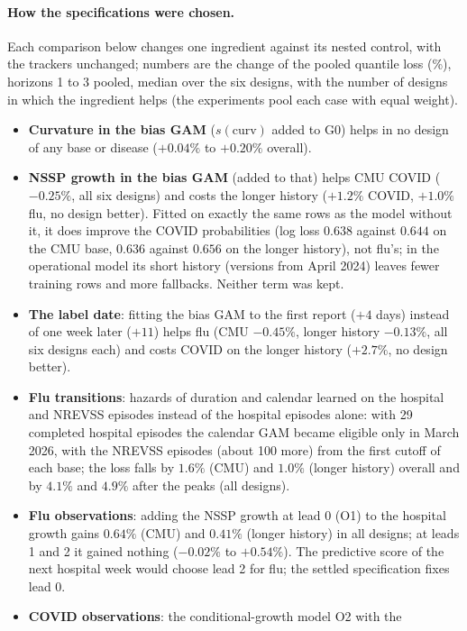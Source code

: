 \documentclass[11pt,a4paper]{article}
\theoremstyle{definition}
\theoremstyle{remark}
\begin{document}
\paragraph{How the specifications were chosen.}
Each comparison below changes one ingredient against its nested control,
with the trackers unchanged; numbers are the change of the pooled quantile
loss (\%), horizons 1 to 3 pooled, median over the six designs, with the
number of designs in which the ingredient helps (the experiments pool each
case with equal weight).
\begin{itemize}[leftmargin=*,itemsep=3pt]
\item \textbf{Curvature in the bias GAM} ($s(\mathrm{curv})$ added to G0) helps
in no design of any base or disease ($+0.04\%$ to $+0.20\%$ overall).
\item \textbf{NSSP growth in the bias GAM} (added to that) helps CMU COVID
($-0.25\%$, all six designs) and costs the longer history ($+1.2\%$ COVID,
$+1.0\%$ flu, no design better). Fitted on exactly the same rows as the model
without it, it does improve the COVID probabilities (log loss $0.638$ against
$0.644$ on the CMU base, $0.636$ against $0.656$ on the longer history), not
flu's; in the operational model its short history (versions from April 2024)
leaves fewer training rows and more fallbacks. Neither term was kept.
\item \textbf{The label date}: fitting the bias GAM to the first report ($+4$
days) instead of one week later ($+11$) helps flu (CMU $-0.45\%$, longer
history $-0.13\%$, all six designs each) and costs COVID on the longer
history ($+2.7\%$, no design better).
\item \textbf{Flu transitions}: hazards of duration and calendar learned on
the hospital and NREVSS episodes instead of the hospital episodes alone: with
29 completed hospital episodes the calendar GAM became eligible only in
March 2026, with the NREVSS episodes (about 100 more) from the first cutoff
of each base; the loss falls by $1.6\%$ (CMU) and $1.0\%$ (longer history)
overall and by $4.1\%$ and $4.9\%$ after the peaks (all designs).
\item \textbf{Flu observations}: adding the NSSP growth at lead 0 (O1) to the
hospital growth gains $0.64\%$ (CMU) and $0.41\%$ (longer history) in all
designs; at leads 1 and 2 it gained nothing ($-0.02\%$ to $+0.54\%$). The
predictive score of the next hospital week would choose lead 2 for flu; the
settled specification fixes lead 0.
\item \textbf{COVID observations}: the conditional-growth model O2 with the

\end{itemize}
\end{document}
